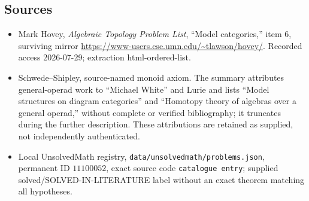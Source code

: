 \documentclass[11pt]{article}
\begin{document}
\subsection{Sources}
\begin{itemize}
\item Mark Hovey, \emph{Algebraic Topology Problem List}, ``Model categories,'' item 6, surviving mirror \url{https://www-users.cse.umn.edu/~tlawson/hovey/}. Recorded access 2026-07-29; extraction html-ordered-list.
\item Schwede--Shipley, source-named monoid axiom. The summary attributes general-operad work to ``Michael White'' and Lurie and lists ``Model structures on diagram categories'' and ``Homotopy theory of algebras over a general operad,'' without complete or verified bibliography; it truncates during the further description. These attributions are retained as supplied, not independently authenticated.
\item Local UnsolvedMath registry, \texttt{data/unsolvedmath/problems.json}, permanent ID \(11100052\), exact source code \texttt{catalogue entry}; supplied solved/SOLVED-IN-LITERATURE label without an exact theorem matching all hypotheses.
\end{itemize}
\end{document}
